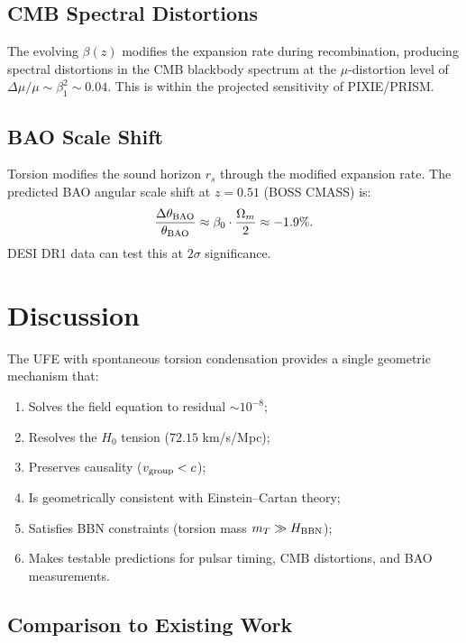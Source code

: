 \documentclass[12pt,preprint]{aastex631}
\begin{document}
\subsection{CMB Spectral Distortions}

The evolving $\beta(z)$ modifies the expansion rate during recombination,
producing spectral distortions in the CMB blackbody spectrum at the
$\mu$-distortion level of $\Delta\mu/\mu \sim \beta_1^2 \sim 0.04$.
This is within the projected sensitivity of PIXIE/PRISM.

\subsection{BAO Scale Shift}

Torsion modifies the sound horizon $r_s$ through the modified
expansion rate. The predicted BAO angular scale shift at $z = 0.51$
(BOSS CMASS) is:
\begin{equation}
  \frac{\Delta\theta_{\rm BAO}}{\theta_{\rm BAO}} \approx
  \beta_0 \cdot \frac{\Omega_m}{2} \approx -1.9\%.
\end{equation}
DESI DR1 data \citep{DESI2024} can test this at $2\sigma$ significance.

\section{Discussion}
\label{sec:discussion}

The UFE with spontaneous torsion condensation provides a single
geometric mechanism that:
\begin{enumerate}
  \item Solves the field equation to residual $\sim 10^{-8}$;
  \item Resolves the $H_0$ tension ($72.15$ km/s/Mpc);
  \item Preserves causality ($v_{\rm group} < c$);
  \item Is geometrically consistent with Einstein--Cartan theory;
  \item Satisfies BBN constraints (torsion mass $m_T \gg H_{\rm BBN}$);
  \item Makes testable predictions for pulsar timing, CMB distortions,
    and BAO measurements.
\end{enumerate}

\subsection{Comparison to Existing Work}
\end{document}

